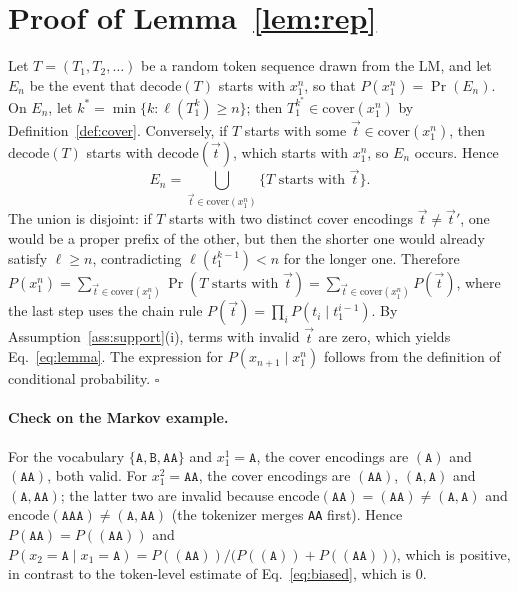 \documentclass{article} %
\newcommand{\enc}{\mathrm{encode}}
\newcommand{\dec}{\mathrm{decode}}
\newcommand{\cov}{\mathrm{cover}}
\begin{document}



\appendix
\section{Proof of Lemma~\ref{lem:rep}}
\label{app:proof}
Let $T = (T_1, T_2, \dots)$ be a random token sequence drawn from the LM, and let $E_n$ be the event that $\dec(T)$ starts with $x_1^n$, so that $P(x_1^n) = \Pr(E_n)$. On $E_n$, let $k^\ast = \min\{k : \ell(T_1^k) \ge n\}$; then $T_1^{k^\ast} \in \cov(x_1^n)$ by Definition~\ref{def:cover}. Conversely, if $T$ starts with some $\vec t \in \cov(x_1^n)$, then $\dec(T)$ starts with $\dec(\vec t)$, which starts with $x_1^n$, so $E_n$ occurs. Hence
\[
E_n = \bigcup_{\vec t \in \cov(x_1^n)} \{T \text{ starts with } \vec t\}.
\]
The union is disjoint: if $T$ starts with two distinct cover encodings $\vec t \ne \vec t'$, one would be a proper prefix of the other, but then the shorter one would already satisfy $\ell \ge n$, contradicting $\ell(t_1^{k-1}) < n$ for the longer one. Therefore $P(x_1^n) = \sum_{\vec t \in \cov(x_1^n)} \Pr(T \text{ starts with } \vec t) = \sum_{\vec t \in \cov(x_1^n)} P(\vec t)$, where the last step uses the chain rule $P(\vec t) = \prod_i P(t_i \mid t_1^{i-1})$. By Assumption~\ref{ass:support}(i), terms with invalid $\vec t$ are zero, which yields Eq.~\eqref{eq:lemma}. The expression for $P(x_{n+1}\mid x_1^n)$ follows from the definition of conditional probability. \hfill $\square$

\paragraph{Check on the Markov example.}
For the vocabulary $\{\texttt{A},\texttt{B},\texttt{AA}\}$ and $x_1^1 = \texttt{A}$, the cover encodings are $(\texttt{A})$ and $(\texttt{AA})$, both valid. For $x_1^2 = \texttt{AA}$, the cover encodings are $(\texttt{AA})$, $(\texttt{A},\texttt{A})$ and $(\texttt{A},\texttt{AA})$; the latter two are invalid because $\enc(\texttt{AA}) = (\texttt{AA}) \neq (\texttt{A},\texttt{A})$ and $\enc(\texttt{AAA}) \neq (\texttt{A},\texttt{AA})$ (the tokenizer merges \texttt{AA} first). Hence $P(\texttt{AA}) = P((\texttt{AA}))$ and $P(x_2 = \texttt{A}\mid x_1 = \texttt{A}) = P((\texttt{AA})) / \bigl(P((\texttt{A})) + P((\texttt{AA}))\bigr)$, which is positive, in contrast to the token-level estimate of Eq.~\eqref{eq:biased}, which is $0$.
\end{document}
